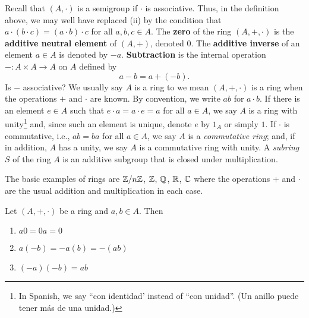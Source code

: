 \documentclass[11pt,a4paper]{article}
\begin{document}
%
Recall that  $(A,\cdot)$ is a semigroup if \(\cdot\) is associative.
Thus, in the definition above, we may well have replaced (ii) by the condition that \(a\cdot(b\cdot c) = (a \cdot b)\cdot c\) for all \(a,b,c\in A\).
The \textbf{zero} of the ring \((A,+,\cdot)\) is the  \textbf{additive neutral element} of $(A,+)$, denoted $0$.
The \textbf{additive inverse} of an element $a\in A$ is denoted by $-a$.
\textbf{Subtraction} is the internal operation \(-\colon A\times A\to A\) on $A$ defined by
\[
a-b = a+(-b).
\]
Is \(-\) associative?
We usually say \(A\) is a ring to we mean \((A,+,\cdot)\) is a ring when the operations \(+\) and \(\cdot\) are known.
By convention, we write $ab$ for  $a\cdot b$.
If there is an element \(e\in A\) such that \(e \cdot a = a \cdot e = a\) for all \(a\in A\), we say \(A\) is a ring with unity\footnote{In Spanish, we say ``con identidad' instead of ``con unidad''. (Un anillo puede tener más de una unidad.)}
and, since such an element is unique,  denote  \(e\) by \(1_A\) or simply \(1\). 
If \(\cdot\) is commutative, i.e., \(ab = ba\) for all \(a\in A\), we say \(A\) is a \textit{commutative ring}; and, if in addition, \(A\) has a unity, we say \(A\) is a commutative ring with unity.
A \textit{subring} $S$ of the ring $A$ is an additive subgroup that is closed under multiplication.



%



\begin{exa}
    The basic examples of rings are \(\mathbb{Z}/n\mathbb{Z}\), $\mathbb{Z}$, $\mathbb{Q}$, $\mathbb{R}$, $\mathbb{C}$ where the operations $+$ and $\cdot$ are the usual addition and multiplication in each case.
\end{exa}
 
\begin{teo}
Let $(A,+,\cdot)$ be a ring and
$a,b \in A$. Then 
\begin{enumerate}[label=(\roman*)]
    \item \(a 0 = 0 a = 0\)
    \item \(a (-b) = -a (b) = -(a b)\)
    \item \((-a)(-b) = a b\)
\end{enumerate}
\end{teo} 
\end{document}
